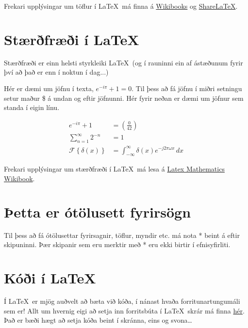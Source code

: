 \documentclass[a4paper]{article}
\begin{document}
Frekari upplýsingar um töflur í \LaTeX\ má finna á \href{https://en.wikibooks.org/wiki/LaTeX/Tables}{Wikibooks} og \href{https://www.sharelatex.com/learn/Tables}{ShareLaTeX}.

\section{Stærðfræði í \LaTeX}
Stærðfræði er einn helsti styrkleiki \LaTeX\ (og í rauninni ein af ástæðunum fyrir því að það er enn í noktun í dag...)

Hér er dæmi um jöfnu í texta, $e^{-i\pi} + 1 = 0$. Til þess að fá jöfnu í miðri setningu setur maður \$ á undan og eftir jöfnunni. Hér fyrir neðan er dæmi um jöfnur sem standa í eigin línu.


\begin{align}
	e^{-i\pi} + 1 &= \left(\frac{0}{42}\right) \\ %
    \sum_{n=1}^{\infty} 2^{-n} &= 1 \\
    \mathcal{F}\left\{ \delta(x) \right\} &= \int_{-\infty}^{\infty} \delta(x) e^{-j 2 \pi \omega x}\,dx\nonumber %
\end{align}


Frekari upplýsingar um stærðfræði í \LaTeX\ má lesa á \href{http://en.wikibooks.org/wiki/LaTeX/Mathematics}{Latex Mathematics Wikibook}.

\pagebreak %

\section*{Þetta er ótölusett fyrirsögn}
Til þess að fá ótölusettar fyrirsagnir, töflur, myndir etc. má nota * beint á eftir skipuninni. Þær skipanir sem eru merktir með * eru ekki birtir í efnisyfirliti.


\section{Kóði í \LaTeX}
Í \LaTeX\ er mjög auðvelt að bæta við kóða, í nánast hvaða forritunartungumáli sem er! Allt um hvernig eigi að setja inn forritsbúta í \LaTeX\ skrár má finna \href{http://en.wikibooks.org/wiki/LaTeX/Source_Code_Listings#Settings}{hér}.
Það er bæði hægt að setja kóða beint í skránna, eins og svona\dots
\end{document}
